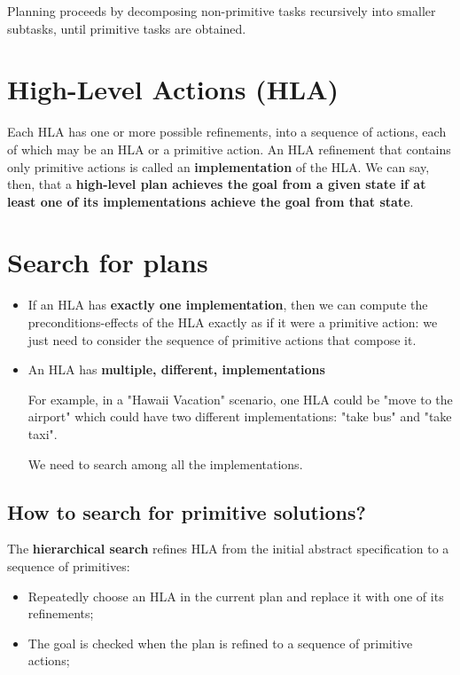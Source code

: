 \documentclass{article}
\begin{document}
\begin{itemize}
Planning proceeds by decomposing non-primitive tasks recursively into smaller subtasks, until primitive tasks are obtained.

\section{High-Level Actions (HLA)}

Each HLA has one or more possible refinements, into a sequence of actions, each of which may be an HLA or a primitive action. An HLA refinement that contains only primitive actions is called an \textbf{implementation} of the
HLA. We can say, then, that a \textbf{high-level plan achieves the goal from a given state if at least
one of its implementations achieve the goal from that state}.

\section{Search for plans}

\begin{itemize}
    \item If an HLA has \textbf{exactly one implementation}, then we can compute the preconditions-effects of the HLA exactly as if it were a primitive action: we just need to consider the sequence of primitive actions that compose it. 
    
    \item An HLA has \textbf{multiple, different, implementations}
    
    For example, in a "Hawaii Vacation" scenario, one HLA could be "move to the airport" which could have two different implementations: "take bus" and "take taxi". 
    
    We need to search among all the implementations.
\end{itemize}

\newpage

\subsection{How to search for primitive solutions?}

The \textbf{hierarchical search} refines HLA from the initial abstract specification to a sequence of primitives:

\begin{itemize}
    \item Repeatedly choose an HLA in the current plan and replace it with one of its refinements;
    \item The goal is checked when the plan is refined to a sequence of primitive actions;
\end{itemize}


\end{itemize}
\end{document}
